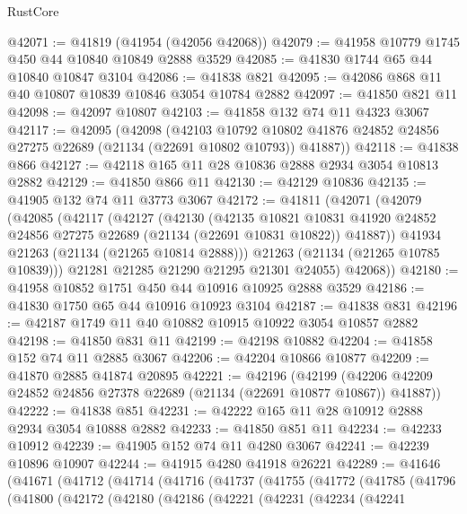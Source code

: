 \begin{lexlean}{RustCore}
\begin{coremodule}
@42071 := @41819 (@41954 (@42056 @42068))
@42079 := @41958 @10779 @1745 @450 @44 @10840 @10849 @2888 @3529
@42085 := @41830 @1744 @65 @44 @10840 @10847 @3104
@42086 := @41838 @821
@42095 := @42086 @868 @11 @40 @10807 @10839 @10846 @3054 @10784 @2882
@42097 := @41850 @821 @11
@42098 := @42097 @10807
@42103 := @41858 @132 @74 @11 @4323 @3067
@42117 := @42095
    (@42098
      (@42103
        @10792
        @10802
        @41876
        @24852
        @24856
        @27275
        @22689
        (@21134 (@22691 @10802 @10793))
        @41887))
@42118 := @41838 @866
@42127 := @42118 @165 @11 @28 @10836 @2888 @2934 @3054 @10813 @2882
@42129 := @41850 @866 @11
@42130 := @42129 @10836
@42135 := @41905 @132 @74 @11 @3773 @3067
@42172 := @41811
    (@42071
      (@42079
        (@42085
          (@42117
            (@42127
              (@42130
                (@42135
                  @10821
                  @10831
                  @41920
                  @24852
                  @24856
                  @27275
                  @22689
                  (@21134 (@22691 @10831 @10822))
                  @41887))
              @41934
              @21263
              (@21134 (@21265 @10814 @2888)))
            @21263
            (@21134 (@21265 @10785 @10839)))
          @21281
          @21285
          @21290
          @21295
          @21301
          @24055)
        @42068))
@42180 := @41958 @10852 @1751 @450 @44 @10916 @10925 @2888 @3529
@42186 := @41830 @1750 @65 @44 @10916 @10923 @3104
@42187 := @41838 @831
@42196 := @42187 @1749 @11 @40 @10882 @10915 @10922 @3054 @10857 @2882
@42198 := @41850 @831 @11
@42199 := @42198 @10882
@42204 := @41858 @152 @74 @11 @2885 @3067
@42206 := @42204 @10866 @10877
@42209 := @41870 @2885 @41874 @20895
@42221 := @42196
    (@42199 (@42206 @42209 @24852 @24856 @27378 @22689 (@21134 (@22691 @10877 @10867)) @41887))
@42222 := @41838 @851
@42231 := @42222 @165 @11 @28 @10912 @2888 @2934 @3054 @10888 @2882
@42233 := @41850 @851 @11
@42234 := @42233 @10912
@42239 := @41905 @152 @74 @11 @4280 @3067
@42241 := @42239 @10896 @10907
@42244 := @41915 @4280 @41918 @26221
@42289 := @41646
    (@41671
      (@41712
        (@41714
          (@41716
            (@41737
              (@41755
                (@41772
                  (@41785
                    (@41796
                      (@41800
                        (@42172
                          (@42180
                            (@42186
                              (@42221
                                (@42231
                                  (@42234
                                    (@42241

\end{coremodule}
\end{lexlean}
